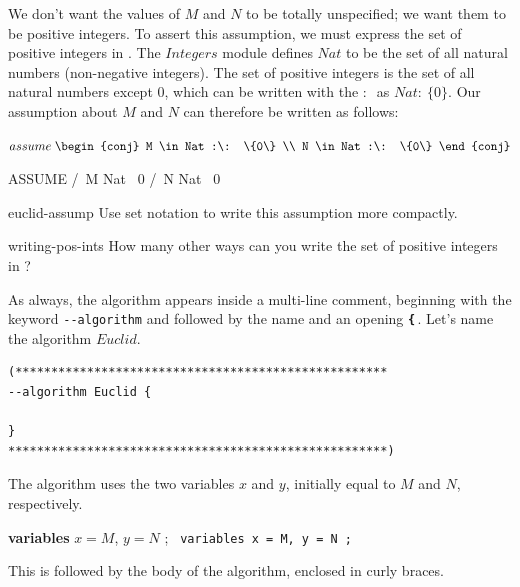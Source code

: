 \documentclass[fleqn,leqno]{article}
\begin{document}
We don't want the values of $M$ and $N$ to be totally unspecified; we
want them to be positive integers.  To assert this assumption, we must
express the set of positive integers in \tlaplus.  The $Integers$
module defines
$Nat$ to be the set of all natural numbers
(non-negative integers).  The set of positive integers is the set of
all natural numbers except 0, which can be written 
with the 
$:\:$ as 
$Nat :\: \{0\}$.
Our assumption about $M$ and $N$ can therefore be written as follows:%
\begin{twocols}
$\ASSUME \; 
     \begin{conj}
        M \in Nat :\: \{0\} \\ N \in Nat :\: \{0\}
     \end{conj}$
\midcol
\begin{verbatim*}
ASSUME /\ M \in Nat \ {0}
       /\ N \in Nat \ {0}
\end{verbatim*}
\end{twocols}
\begin{aquestion}{euclid-assump}
Use set notation to write this assumption more compactly.
\end{aquestion}
\begin{aquestion}{writing-pos-ints}
How many other ways can you write the set of positive integers
in \tlaplus?
\end{aquestion}
%
As always, the algorithm appears inside a multi-line comment,
beginning with the keyword \verb|--algorithm| and followed by the name
and an opening \texttt{\bf\{}\,.  Let's name the algorithm $Euclid$.
\begin{display}
\begin{verbatim}
(****************************************************
--algorithm Euclid {

}
*****************************************************)
\end{verbatim}
\end{display}
The algorithm uses the two
variables $x$ and $y$, initially equal to $M$ and $N$,
respectively.
\begin{twocols}
\textbf{variables} $x = M$, $y = N$ ;
\midcol
\verb*| variables x = M, y = N ;|
\end{twocols}
This is followed by the body of the algorithm, enclosed
in curly braces.
\end{document}
